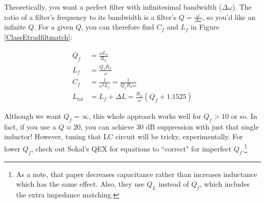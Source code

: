 \documentclass[10pt,letterpaper]{article}
\begin{document}
\begin{enumerate}
Theoretically, you want a perfect filter with infinitesimal bandwidth ($\Delta \omega$). The ratio of a filter's frequency to its bandwidth is a filter's $Q=\frac{\omega}{\Delta \omega}$, so you'd like an infinite $Q$. For a given $Q$, you can therefore find $C_f$ and $L_f$ in Figure \ref{ClassEtradfiltmatch}:

\begin{align*}
Q_f &=\frac{\omega L_f}{R_L}\\
L_f &=\frac{Q_f R_L}{\omega} \\
C_f &= \frac{1}{\omega^2 L_f}=\frac{1}{Q_f R_L \omega}\\
L_{tot} & = L_f+\Delta L=\frac{R_L}{\omega}\left(Q_f+1.1525\right)
\end{align*}

Although we want $Q_f=\infty$, this whole approach works well for $Q_f>10$ or so. In fact, if you use a $Q\approx 20$, you can achieve 30 dB suppression with just that single inductor! However, tuning that LC circuit will be tricky, experimentally.  For lower $Q_f$, check out Sokal's QEX for equations to ``correct" for imperfect $Q_f$.\footnote{As a note, that paper decreases capacitance rather than increases inductance which has the same effect. Also, they use $Q_L$ instead of $Q_f$, which includes the extra impedance matching.}

\end{enumerate}
\end{document}

